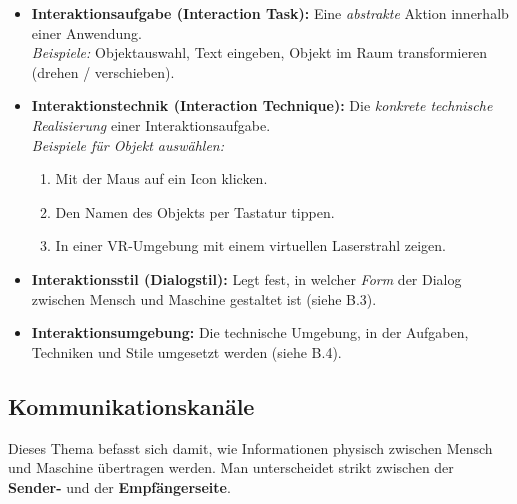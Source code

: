 \documentclass[12pt, a4paper]{article}
\begin{document}
\begin{itemize}
  \item \textbf{Interaktionsaufgabe (Interaction Task):} Eine \textit{abstrakte}
        Aktion innerhalb einer Anwendung.\\
        \textit{Beispiele:} Objektauswahl, Text eingeben, Objekt im Raum transformieren
        (drehen / verschieben).

  \item \textbf{Interaktionstechnik (Interaction Technique):} Die \textit{konkrete
        technische Realisierung} einer Interaktionsaufgabe.\\
        \textit{Beispiele für \glqq{}Objekt auswählen\grqq{}:}
        \begin{enumerate}
          \item Mit der Maus auf ein Icon klicken.
          \item Den Namen des Objekts per Tastatur tippen.
          \item In einer VR-Umgebung mit einem \glqq{}virtuellen Laserstrahl\grqq{} zeigen.
        \end{enumerate}

  \item \textbf{Interaktionsstil (Dialogstil):} Legt fest, in welcher \textit{Form}
        der Dialog zwischen Mensch und Maschine gestaltet ist (siehe B.3).

  \item \textbf{Interaktionsumgebung:} Die technische Umgebung, in der Aufgaben,
        Techniken und Stile umgesetzt werden (siehe B.4).
\end{itemize}


\subsection{Kommunikationskanäle}

Dieses Thema befasst sich damit, wie Informationen physisch zwischen Mensch und Maschine
übertragen werden. Man unterscheidet strikt zwischen der \textbf{Sender-} und der
\textbf{Empfängerseite}.
\end{document}
